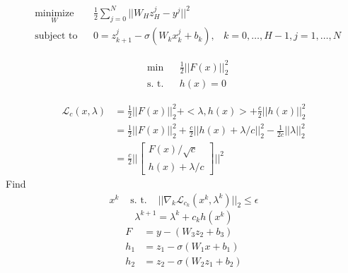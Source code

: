 \documentclass[11pt]{article}
\begin{document}
\begin{equation*}
	\begin{aligned}
	& \underset{W}{\text{minimize}}
	& & \frac{1}{2}\sum\limits_{j=0}^{N}||W_Hz_H^j - y^j||^2 \\
	& \text{subject to}
	& & 0  = z_{k+1}^j - \sigma(W_kx_k^j + b_k), &k = 0,\ldots,H-1,j = 1,\ldots,N
	\end{aligned}
\end{equation*}


\begin{equation*}
	\begin{aligned}
	& \text{min}
	&  & \frac{1}{2} ||F(x)||^2_2 \\
	& \text{s. t.}
	& &  h(x) = 0
	\end{aligned}
\end{equation*}

\begin{equation*}
	\begin{aligned}
		\mathcal{L}_c(x,\lambda)
		&= \frac{1}{2} ||F(x)||^2_2 + <\lambda,h(x)> + \frac{c}{2} || h(x) ||^2_2 \\
		&= \frac{1}{2} ||F(x)||^2_2 + \frac{c}{2} ||h(x) + \lambda/c ||^2_2 - \frac{1}{2c} ||\lambda||^2_2 \\
		&= \frac{c}{2} \Big|\Big|
		\begin{bmatrix}
			F(x)/\sqrt{c} \\
			h(x) + \lambda/c
		\end{bmatrix} \Big|\Big|^2
	\end{aligned}
\end{equation*}
Find
\begin{equation}
\begin{aligned}
x^k & \text{ s. t. }&  ||\nabla_k\mathcal{L}_{c_k}(x^k,\lambda^k)||_2 \leq \epsilon
\end{aligned}
\end{equation}
\begin{equation}
\lambda^{k+1} = \lambda^k + c_kh(x^k)
\end{equation}
\begin{equation}
\begin{aligned}
F   &= y - (W_3z_2+b_3) \\
h_1 &= z_1 - \sigma(W_1x+b_1) \\
h_2 &= z_2 - \sigma(W_2z_1+b_2)
\end{aligned}
\end{equation}
\end{document}

